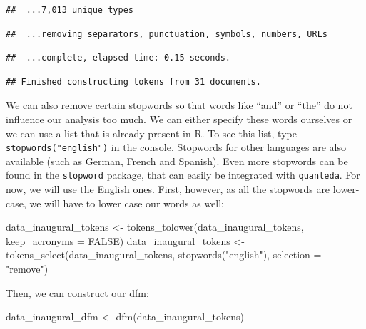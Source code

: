 \documentclass[
]{book}
\newenvironment{Shaded}{\begin{snugshade}}{\end{snugshade}}
\newcommand{\AttributeTok}[1]{\textcolor[rgb]{0.77,0.63,0.00}{#1}}
\newcommand{\ConstantTok}[1]{\textcolor[rgb]{0.00,0.00,0.00}{#1}}
\newcommand{\FunctionTok}[1]{\textcolor[rgb]{0.00,0.00,0.00}{#1}}
\newcommand{\NormalTok}[1]{#1}
\newcommand{\OtherTok}[1]{\textcolor[rgb]{0.56,0.35,0.01}{#1}}
\newcommand{\StringTok}[1]{\textcolor[rgb]{0.31,0.60,0.02}{#1}}
\begin{document}
\begin{verbatim}
##  ...7,013 unique types
\end{verbatim}

\begin{verbatim}
##  ...removing separators, punctuation, symbols, numbers, URLs
\end{verbatim}

\begin{verbatim}
##  ...complete, elapsed time: 0.15 seconds.
\end{verbatim}

\begin{verbatim}
## Finished constructing tokens from 31 documents.
\end{verbatim}

We can also remove certain stopwords so that words like ``and'' or ``the'' do not influence our analysis too much. We can either specify these words ourselves or we can use a list that is already present in R. To see this list, type \texttt{stopwords("english")} in the console. Stopwords for other languages are also available (such as German, French and Spanish). Even more stopwords can be found in the \texttt{stopword} package, that can easily be integrated with \texttt{quanteda}. For now, we will use the English ones. First, however, as all the stopwords are lower-case, we will have to lower case our words as well:

\begin{Shaded}
\begin{Highlighting}[]
\NormalTok{data\_inaugural\_tokens }\OtherTok{\textless{}{-}} \FunctionTok{tokens\_tolower}\NormalTok{(data\_inaugural\_tokens, }\AttributeTok{keep\_acronyms =} \ConstantTok{FALSE}\NormalTok{)}
\NormalTok{data\_inaugural\_tokens }\OtherTok{\textless{}{-}} \FunctionTok{tokens\_select}\NormalTok{(data\_inaugural\_tokens, }\FunctionTok{stopwords}\NormalTok{(}\StringTok{"english"}\NormalTok{), }\AttributeTok{selection =} \StringTok{"remove"}\NormalTok{)}
\end{Highlighting}
\end{Shaded}

Then, we can construct our dfm:

\begin{Shaded}
\begin{Highlighting}[]
\NormalTok{data\_inaugural\_dfm }\OtherTok{\textless{}{-}} \FunctionTok{dfm}\NormalTok{(data\_inaugural\_tokens)}
\end{Highlighting}
\end{Shaded}
\end{document}
